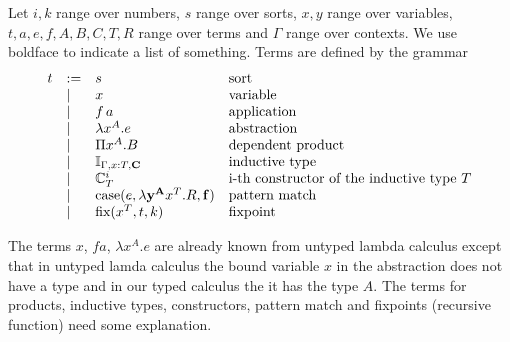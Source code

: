 \begin{definition}
  Let $i,k$ range over numbers, $s$ range over sorts, $x,y$ range over
  variables, $t, a, e, f, A, B, C, T, R$ range over terms and $\Gamma$ range
  over contexts. We use boldface to indicate a list of something. Terms are
  defined by the grammar
  $$
  \begin{array}{lllll}
    t &:= & s  & \text{sort}
    \\
      & \mid & x & \text{variable}
    \\
      & \mid & f \, a & \text{application}
    \\
      & \mid & \lambda x^A. e & \text{abstraction}
    \\
      & \mid & \Pi x^A.B & \text{dependent product}
    \\
      & \mid & \mathbb{I}_{\Gamma,x:T,\mathbf{C}} & \text{inductive type}
    \\
      & \mid & \mathbb{C}^i_T & \text{i-th constructor of the inductive type } T
    \\
      & \mid & \text{case}(e, \lambda \mathbf{y}^{\mathbf{A}} x^T.R, \mathbf{f}) & \text{pattern match}
    \\
      & \mid & \text{fix}(x^T, t, k) & \text{fixpoint}
  \end{array}
  $$
\end{definition}

The terms $x$, $f a$, $\lambda x^A.e$ are already known from untyped lambda
calculus except that in untyped lamda calculus the bound variable $x$ in the
abstraction does not have a type and in our typed calculus the it has the type
$A$. The terms for products, inductive types, constructors, pattern match and
fixpoints (recursive function) need some explanation.

